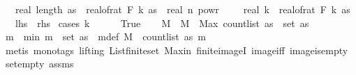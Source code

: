 \begin{isabellebody}
\ \ \ {\isachardoublequoteopen}real\ {\isacharparenleft}{\kern0pt}length\ as{\isacharparenright}{\kern0pt}\ {\isacharasterisk}{\kern0pt}\ real{\isacharunderscore}{\kern0pt}of{\isacharunderscore}{\kern0pt}rat\ {\isacharparenleft}{\kern0pt}F\ {\isacharparenleft}{\kern0pt}{}{\isacharasterisk}{\kern0pt}k{\isacharminus}{\kern0pt}{}{\isacharparenright}{\kern0pt}\ as{\isacharparenright}{\kern0pt}\ {\isasymle}\ real\ n\ powr\ {\isacharparenleft}{\kern0pt}{}\ {\isacharminus}{\kern0pt}\ {}\ {\isacharslash}{\kern0pt}\ real\ k{\isacharparenright}{\kern0pt}\ {\isacharasterisk}{\kern0pt}\ {\isacharparenleft}{\kern0pt}real{\isacharunderscore}{\kern0pt}of{\isacharunderscore}{\kern0pt}rat\ {\isacharparenleft}{\kern0pt}F\ k\ as{\isacharparenright}{\kern0pt}{\isacharparenright}{\kern0pt}{\isacharcircum}{\kern0pt}{}{\isachardoublequoteclose}\isanewline
\ \ {\isacharparenleft}{\kern0pt}\ {\isachardoublequoteopen}{\isacharquery}{\kern0pt}lhs\ {\isasymle}\ {\isacharquery}{\kern0pt}rhs{\isachardoublequoteclose}{\isacharparenright}{\kern0pt}\isanewline
%
\isadelimproof
%
\endisadelimproof
%
\isatagproof
{}\isamarkupfalse%
\ {\isacharparenleft}{\kern0pt}cases\ {\isachardoublequoteopen}k\ {\isasymge}\ {}{\isachardoublequoteclose}{\isacharparenright}{\kern0pt}\isanewline
\ \ \isamarkupfalse%
\ True\isanewline
\ \ \isamarkupfalse%
\ M\ \ {\isachardoublequoteopen}M\ {\isacharequal}{\kern0pt}\ Max\ {\isacharparenleft}{\kern0pt}count{\isacharunderscore}{\kern0pt}list\ as\ {\isacharbackquote}{\kern0pt}\ set\ as{\isacharparenright}{\kern0pt}{\isachardoublequoteclose}\ \isanewline
\ \ \isamarkupfalse%
\ \isamarkupfalse%
\ m\ \ m{\isacharunderscore}{\kern0pt}in{\isacharcolon}{\kern0pt}\ {\isachardoublequoteopen}m\ {\isasymin}\ set\ as{\isachardoublequoteclose}\ \ m{\isacharunderscore}{\kern0pt}def{\isacharcolon}{\kern0pt}\ {\isachardoublequoteopen}M\ {\isacharequal}{\kern0pt}\ count{\isacharunderscore}{\kern0pt}list\ as\ m{\isachardoublequoteclose}\isanewline
\ \ \ \ \isamarkupfalse%
\ {\isacharparenleft}{\kern0pt}metis\ {\isacharparenleft}{\kern0pt}mono{\isacharunderscore}{\kern0pt}tags{\isacharcomma}{\kern0pt}\ lifting{\isacharparenright}{\kern0pt}\ List{\isachardot}{\kern0pt}finite{\isacharunderscore}{\kern0pt}set\ Max{\isacharunderscore}{\kern0pt}in\ finite{\isacharunderscore}{\kern0pt}imageI\ image{\isacharunderscore}{\kern0pt}iff\ image{\isacharunderscore}{\kern0pt}is{\isacharunderscore}{\kern0pt}empty\ set{\isacharunderscore}{\kern0pt}empty\ assms{\isacharparenleft}{\kern0pt}{}{\isacharparenright}{\kern0pt}{\isacharparenright}{\kern0pt}\isanewline

\end{isabellebody}
